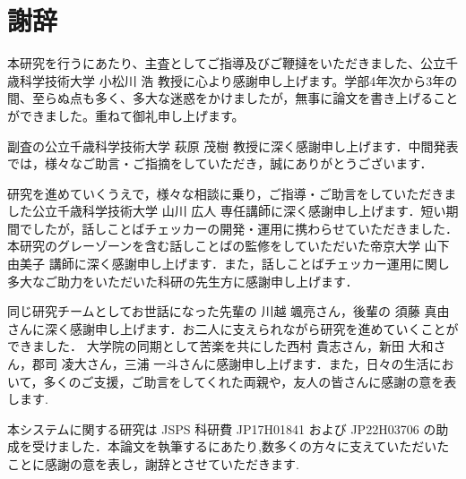 \chapter*{謝辞}

本研究を行うにあたり、主査としてご指導及びご鞭撻をいただきました、公立千歳科学技術大学 小松川 浩 教授に心より感謝申し上げます。学部4年次から3年の間、至らぬ点も多く、多大な迷惑をかけましたが，無事に論文を書き上げることができました。重ねて御礼申し上げます。

副査の公立千歳科学技術大学 萩原 茂樹 教授に深く感謝申し上げます．中間発表では，様々なご助言・ご指摘をしていただき，誠にありがとうございます．

研究を進めていくうえで，様々な相談に乗り，ご指導・ご助言をしていただきました公立千歳科学技術大学 山川 広人 専任講師に深く感謝申し上げます．短い期間でしたが，話しことばチェッカーの開発・運用に携わらせていただきました．本研究のグレーゾーンを含む話しことばの監修をしていただいた帝京大学 山下由美子 講師に深く感謝申し上げます．また，話しことばチェッカー運用に関し多大なご助力をいただいた科研の先生方に感謝申し上げます．

同じ研究チームとしてお世話になった先輩の 川越 颯亮さん，後輩の 須藤 真由 さんに深く感謝申し上げます．お二人に支えられながら研究を進めていくことができました．
大学院の同期として苦楽を共にした西村 貴志さん，新田 大和さん，郡司 凌大さん，三浦 一斗さんに感謝申し上げます．また，日々の生活において，多くのご支援，ご助言をしてくれた両親や，友人の皆さんに感謝の意を表します.

本システムに関する研究は JSPS 科研費 JP17H01841 および JP22H03706 の助成を受けました．本論文を執筆するにあたり,数多くの方々に支えていただいたことに感謝の意を表し，謝辞とさせていただきます.